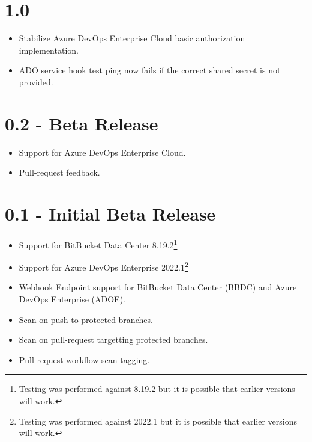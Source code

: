 \section{1.0}

\begin{itemize}
    \item Stabilize Azure DevOps Enterprise Cloud basic authorization implementation.
    \item ADO service hook test ping now fails if the correct shared secret is not provided.
\end{itemize}


\section{0.2 - Beta Release}
   

\begin{itemize}
    \item Support for Azure DevOps Enterprise Cloud.
    \item Pull-request feedback.
\end{itemize}

\section{0.1 - Initial Beta Release}
   

\begin{itemize}
    \item Support for BitBucket Data Center 8.19.2\footnote{Testing was performed against 8.19.2 but it is possible that earlier versions will work.}
    \item Support for Azure DevOps Enterprise 2022.1\footnote{Testing was performed against 2022.1 but it is possible that earlier versions will work.}
    \item Webhook Endpoint support for BitBucket Data Center (BBDC) and Azure DevOps Enterprise (ADOE).
    \item Scan on push to protected branches.
    \item Scan on pull-request targetting protected branches.
    \item Pull-request workflow scan tagging.
\end{itemize}